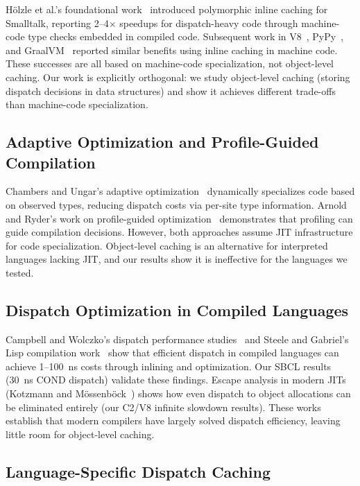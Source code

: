 \documentclass[sigplan,final,acmsmall,review,screen]{acmart}
\begin{document}
Hölzle et al.'s foundational work~\cite{hoelzle1991optimizing} introduced polymorphic inline caching for Smalltalk, reporting 2--4$\times$ speedups for dispatch-heavy code through machine-code type checks embedded in compiled code. Subsequent work in V8~\cite{bak2010v8}, PyPy~\cite{pypy2}, and GraalVM~\cite{graalvm} reported similar benefits using inline caching in machine code. These successes are all based on machine-code specialization, not object-level caching. Our work is explicitly orthogonal: we study object-level caching (storing dispatch decisions in data structures) and show it achieves different trade-offs than machine-code specialization.

\subsection{Adaptive Optimization and Profile-Guided Compilation}

Chambers and Ungar's adaptive optimization~\cite{chambers1989optimizing} dynamically specializes code based on observed types, reducing dispatch costs via per-site type information. Arnold and Ryder's work on profile-guided optimization~\cite{arnold2005feedback} demonstrates that profiling can guide compilation decisions. However, both approaches assume JIT infrastructure for code specialization. Object-level caching is an alternative for interpreted languages lacking JIT, and our results show it is ineffective for the languages we tested.

\subsection{Dispatch Optimization in Compiled Languages}

Campbell and Wolczko's dispatch performance studies~\cite{campbell1992array} and Steele and Gabriel's Lisp compilation work~\cite{steele1990lisp} show that efficient dispatch in compiled languages can achieve 1--100~ns costs through inlining and optimization. Our SBCL results (30~ns COND dispatch) validate these findings. Escape analysis in modern JITs (Kotzmann and Mössenböck~\cite{kotzmann2005escape}) shows how even dispatch to object allocations can be eliminated entirely (our C2/V8 infinite slowdown results). These works establish that modern compilers have largely solved dispatch efficiency, leaving little room for object-level caching.

\subsection{Language-Specific Dispatch Caching}
\end{document}
